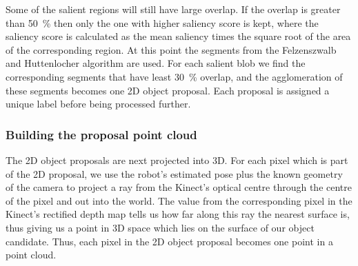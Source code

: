 \documentclass[a4paper,11pt,english]{article}
\begin{document}
Some of the salient regions will still have large overlap.
If the overlap is greater than \SI{50}{\percent} then only the one with higher saliency score is kept, where the saliency score is calculated as the mean saliency times the square root of the area of the corresponding region.
At this point the segments from the Felzenszwalb and Huttenlocher algorithm are used.
For each salient blob we find the corresponding segments that have least \SI{30}{\percent} overlap, and the agglomeration of these segments becomes one 2D object proposal.
Each proposal is assigned a unique label before being processed further.

\subsubsection{Building the proposal point cloud}
\label{sssec:building_proposal_point_cloud}

The 2D object proposals are next projected into 3D.
For each pixel which is part of the 2D proposal, we use the robot's estimated pose plus the known geometry of the camera to project a ray from the Kinect's optical centre through the centre of the pixel and out into the world.
The value from the corresponding pixel in the Kinect's rectified depth map tells us how far along this ray the nearest surface is, thus giving us a point in 3D space which lies on the surface of our object candidate.
Thus, each pixel in the 2D object proposal becomes one point in a point cloud.


\end{document}
